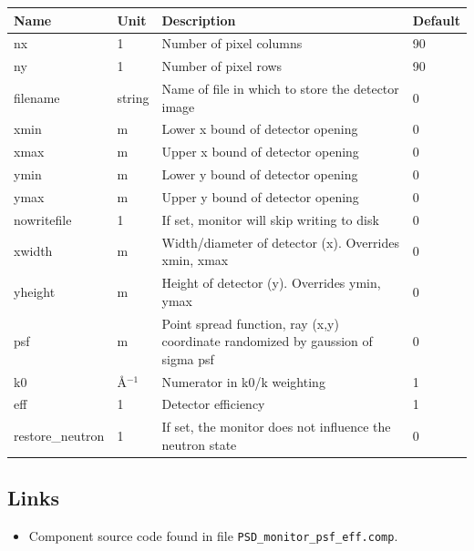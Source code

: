 \begin{longtable}{p{}p{}p{}p{}}
\toprule
\textbf{Name} & \textbf{Unit} & \textbf{Description} & \textbf{Default} \\
\midrule
\endhead
nx & 1 & Number of pixel columns & 90 \\
ny & 1 & Number of pixel rows & 90 \\
filename & string & Name of file in which to store the detector image & 0 \\
xmin & m & Lower x bound of detector opening & 0 \\
xmax & m & Upper x bound of detector opening & 0 \\
ymin & m & Lower y bound of detector opening & 0 \\
ymax & m & Upper y bound of detector opening & 0 \\
nowritefile & 1 & If set, monitor will skip writing to disk & 0 \\
xwidth & m & Width/diameter of detector (x). Overrides xmin, xmax & 0 \\
yheight & m & Height of detector (y). Overrides ymin, ymax & 0 \\
psf & m & Point spread function, ray (x,y) coordinate randomized by gaussion of sigma psf & 0 \\
k0 & \AA{}$^{-1}$ & Numerator in k0/k weighting & 1 \\
eff & 1 & Detector efficiency & 1 \\
restore\_neutron & 1 & If set, the monitor does not influence the neutron state & 0 \\
\bottomrule
\end{longtable}

\subsection*{Links}
\begin{itemize}
  \item Component source code found in file \texttt{PSD\_monitor\_psf\_eff.comp}.
\end{itemize}
